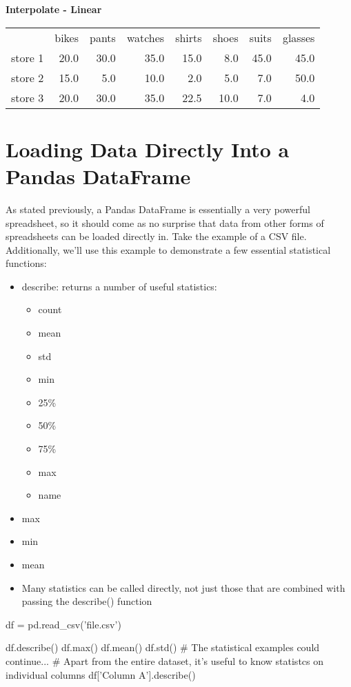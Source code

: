 \documentclass{article}
\begin{document}
\textbf{Interpolate - Linear}
\begin{center}
	\begin{tabular}{lrrrrrrr}
		{} &  bikes &  pants &  watches &  shirts &  shoes &  suits &  glasses \\
		store 1 &   20.0 &   30.0 &     35.0 &    15.0 &    8.0 &   45.0 &     45.0 \\
		store 2 &   15.0 &    5.0 &     10.0 &     2.0 &    5.0 &    7.0 &     50.0 \\
		store 3 &   20.0 &   30.0 &     35.0 &    22.5 &   10.0 &    7.0 &      4.0 \\
	\end{tabular}
\end{center}


\section{Loading Data Directly Into a Pandas DataFrame}\label{sec:concept7}
As stated previously, a Pandas DataFrame is essentially a very powerful spreadsheet, so it should come as no surprise that data from other forms of spreadsheets can be loaded directly in. Take the example of a CSV file. Additionally, we'll use this example to demonstrate a few essential statistical functions:

\begin{itemize}
	\item describe: returns a number of useful statistics:
	\begin{itemize}
		\item count
		\item mean
		\item std
		\item min
		\item 25\%
		\item 50\%
		\item 75\%
		\item max
		\item name
	\end{itemize}
	\item max
	\item min
	\item mean
	\item Many statistics can be called directly, not just those that are combined with passing the describe() function
\end{itemize}

\begin{python}
	df = pd.read_csv('file.csv')
	
	df.describe()
	df.max()
	df.mean()
	df.std()
	# The statistical examples could continue...
	# Apart from the entire dataset, it's useful to know statistcs on individual columns
	df['Column A'].describe()
\end{python}
\end{document}
